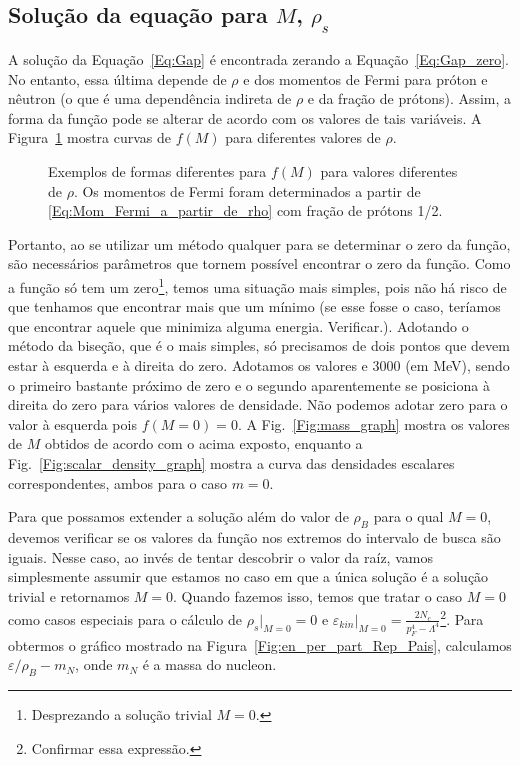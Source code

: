 \subsection{Solução da equação para $M$, $\rho_s$}

A solução da Equação~\eqref{Eq:Gap} é encontrada zerando a Equação~\eqref{Eq:Gap_zero}. No entanto, essa última depende de $\rho$ e dos momentos de Fermi para próton e nêutron (o que é uma dependência indireta de $\rho$ e da fração de prótons). Assim, a forma da função pode se alterar de acordo com os valores de tais variáveis. A Figura~\ref{Fig:Gap_zero_graph} mostra curvas de $f(M)$ para diferentes valores de $\rho$.

\begin{figure}
	
	\caption{Exemplos de formas diferentes para $f(M)$ para valores diferentes de $\rho$. Os momentos de Fermi foram determinados a partir de \eqref{Eq:Mom_Fermi_a_partir_de_rho} com fração de prótons 1/2. \protect}
	\label{Fig:Gap_zero_graph}
\end{figure}

Portanto, ao se utilizar um método qualquer para se determinar o zero da função, são necessários parâmetros que tornem possível encontrar o zero da função. Como a função só tem um zero\footnote[][1cm]{Desprezando a solução trivial $M = 0$.}, temos uma situação mais simples, pois não há risco de que tenhamos que encontrar mais que um mínimo (se esse fosse o caso, teríamos que encontrar aquele que minimiza alguma energia\cite{Buballa}. Verificar.). Adotando o método da biseção, que é o mais simples, só precisamos de dois pontos que devem estar à esquerda e à direita do zero. Adotamos os valores  e 3000 (em MeV), sendo o primeiro bastante próximo de zero e o segundo aparentemente se posiciona à direita do zero para vários valores de densidade. Não podemos adotar zero para o valor à esquerda pois $f(M=0) = 0$. A Fig.~\ref{Fig:mass_graph} mostra os valores de $M$ obtidos de acordo com o acima exposto, enquanto a Fig.~\ref{Fig:scalar_density_graph} mostra a curva das densidades escalares correspondentes, ambos para o caso $m = 0$.

Para que possamos extender a solução além do valor de $\rho_B$ para o qual $M = 0$, devemos verificar se os valores da função nos extremos do intervalo de busca são iguais. Nesse caso, ao invés de tentar descobrir o valor da raíz, vamos simplesmente assumir que estamos no caso em que a única solução é a solução trivial e retornamos $M = 0$. Quando fazemos isso, temos que tratar o caso $M = 0$ como casos especiais para o cálculo de $\rho_s|_{M=0} = 0$ e $\varepsilon_{kin}|_{M=0} = \frac{2 N_c}{p_F^4 - \Lambda^4}$\footnote{Confirmar essa expressão.}. Para obtermos o gráfico mostrado na Figura~\eqref{Fig:en_per_part_Rep_Pais}, calculamos $\varepsilon / \rho_B - m_N$, onde $m_N$ é a massa do nucleon.

